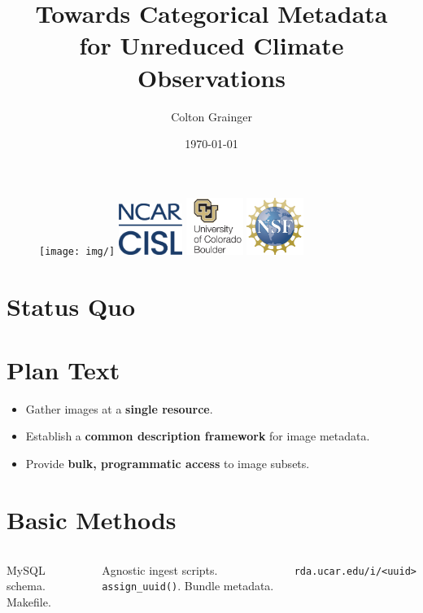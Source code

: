 \documentclass{beamer}
\title[Towards Categorical Metadata]{Towards Categorical Metadata\\ for Unreduced Climate Observations}
\author[C.~Grainger]{Colton Grainger}
\institute{University of Colorado}
\date{\today}
\begin{document}
\begin{frame}
    \titlepage
    \vfill
    \begin{figure}
        \texttt{[image: img/]}
        \includegraphics[height=4.5em]{img/CISL-contemp-logo-blue-square}\hspace{0.5em}
        \includegraphics[height=5em]{img/cu-logo}\hspace{0.5em}
        \includegraphics[height=5em]{img/nsf-logo}
    \end{figure}
\end{frame}

\section{Status Quo}
\section{Plan Text}

\begin{frame}
    \begin{itemize}
        \item Gather images at a \textbf{single resource}.
        \item Establish a \textbf{common description framework} for image metadata.
        \item Provide \textbf{bulk, programmatic access} to image subsets.
    \end{itemize}
\end{frame}

\section{Basic Methods}

\begin{frame}
	\begin{columns}
        MySQL schema. Makefile.

        Agnostic ingest scripts.
        \texttt{assign\_uuid()}.
        Bundle metadata.

        \texttt{rda.ucar.edu/i/<uuid>}
	\end{columns}
\end{frame}
\end{document}
